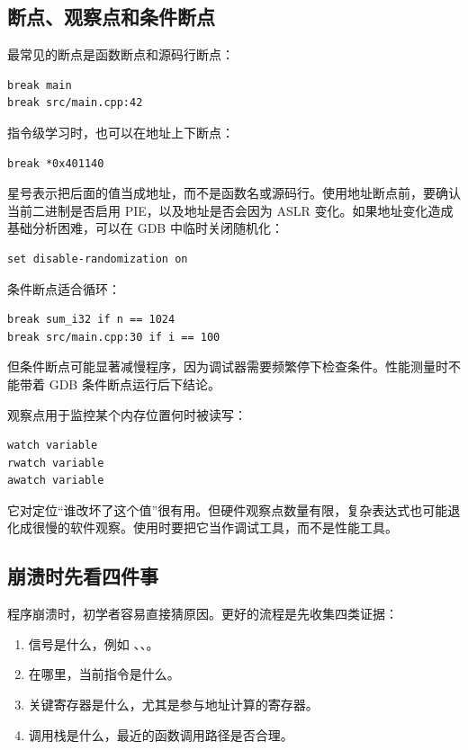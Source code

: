 \subsection{断点、观察点和条件断点}

最常见的断点是函数断点和源码行断点：

\begin{lstlisting}
break main
break src/main.cpp:42
\end{lstlisting}

指令级学习时，也可以在地址上下断点：

\begin{lstlisting}
break *0x401140
\end{lstlisting}

星号表示把后面的值当成地址，而不是函数名或源码行。使用地址断点前，要确认当前二进制是否启用 PIE，以及地址是否会因为 ASLR 变化。如果地址变化造成基础分析困难，可以在 GDB 中临时关闭随机化：

\begin{lstlisting}
set disable-randomization on
\end{lstlisting}

条件断点适合循环：

\begin{lstlisting}
break sum_i32 if n == 1024
break src/main.cpp:30 if i == 100
\end{lstlisting}

但条件断点可能显著减慢程序，因为调试器需要频繁停下检查条件。性能测量时不能带着 GDB 条件断点运行后下结论。

观察点用于监控某个内存位置何时被读写：

\begin{lstlisting}
watch variable
rwatch variable
awatch variable
\end{lstlisting}

它对定位“谁改坏了这个值”很有用。但硬件观察点数量有限，复杂表达式也可能退化成很慢的软件观察。使用时要把它当作调试工具，而不是性能工具。

\subsection{崩溃时先看四件事}

程序崩溃时，初学者容易直接猜原因。更好的流程是先收集四类证据：

\begin{enumerate}
  \item 信号是什么，例如 、、。
  \item {} 在哪里，当前指令是什么。
  \item 关键寄存器是什么，尤其是参与地址计算的寄存器。
  \item 调用栈是什么，最近的函数调用路径是否合理。
\end{enumerate}

